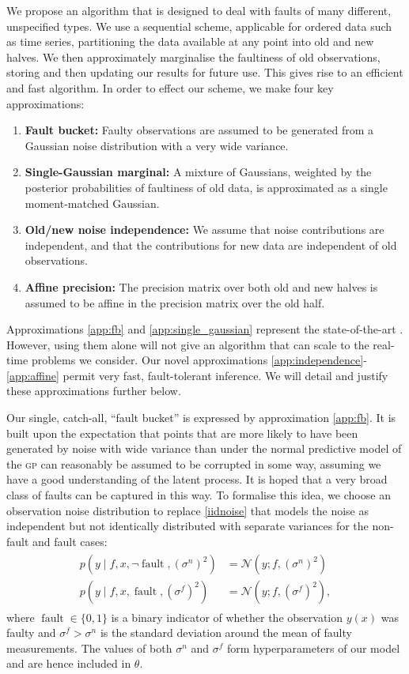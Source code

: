 \documentclass[letterpaper]{article}
\newcommand{\deq}{=}
\newcommand{\given}{\!\ensuremath{\mid}\!}
\newcommand{\cm}[1]{\ensuremath{\mathcal{#1}}}
\newcommand{\acro}[1]{\textsc{\MakeLowercase{#1}}}
\DeclareMathOperator{\fault}{fault}
\begin{document}
We propose an algorithm that is designed to deal with faults of many different, unspecified types. We use a sequential scheme, applicable for ordered data such as time series, partitioning the data available at any point into old and new halves.  We then approximately marginalise the faultiness of old observations, storing and then updating our results for future use. This gives rise to an efficient and fast algorithm. In order to effect our scheme, we make four key approximations:
\begin{enumerate}
 \item \label{app:fb} {\bf Fault bucket:} Faulty observations are assumed to be generated from a Gaussian noise distribution with a very wide variance.
\item \label{app:single_gaussian} {\bf Single-Gaussian marginal:} A mixture of Gaussians, weighted by the posterior probabilities of faultiness of old data, is approximated as a single moment-matched Gaussian.
\item \label{app:independence} {\bf Old/new noise independence:} We assume that noise contributions are independent, and that the contributions for new data are independent of old observations.
\item \label{app:affine} {\bf Affine precision:} The precision matrix over both old and new halves is assumed to be affine in the precision matrix over the old half.
\end{enumerate}
Approximations \ref{app:fb} and \ref{app:single_gaussian} represent the state-of-the-art \cite{Dereszynski}. However, using them alone will not give an algorithm that can scale to the real-time problems we consider. Our novel approximations \ref{app:independence}-\ref{app:affine} permit very fast, fault-tolerant inference. We will detail and justify these approximations further below.

Our single, catch-all, ``fault bucket'' is expressed by approximation \ref{app:fb}. It is built upon the expectation that points that are more likely to have been generated by noise with wide variance than under the normal
predictive model of the \acro{gp} can reasonably be assumed to
be corrupted in some way, assuming we have a good understanding of the
latent process. It is hoped that a very broad class of faults can be
captured in this way. 
To formalise this idea, we choose an observation noise distribution to
replace \eqref{iidnoise} that models the noise as independent
but not identically distributed with separate variances for the
non-fault and fault cases:
\begin{align}
\begin{split}\label{eq:observation_likelihood}
  p(y \given f, x, \neg\fault, (\sigma^n)^2)
 &
 \deq
 \cm{N}(y; f, (\sigma^n)^2)
 \\
 p(y \given f, x, \fault, (\sigma^f)^2)
 &
 \deq
 \cm{N}(y; f, (\sigma^f)^2),
\end{split}
\end{align}
where $\fault \in \lbrace 0, 1 \rbrace$ is a binary indicator of
whether the observation $y(x)$ was faulty and $\sigma^f > \sigma^n$ is
the standard deviation around the mean of faulty measurements.  The
values of both $\sigma^n$ and $\sigma^f$ form hyperparameters of our
model and are hence included in $\theta$.
\end{document}
